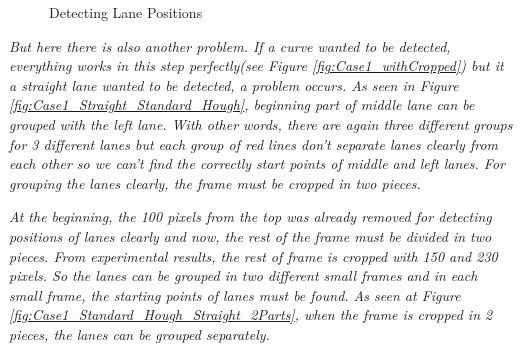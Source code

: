 \begin{figure}[H]
  \centering
  \hfill
  \caption{Detecting Lane Positions}
\end{figure}


\emph{\color{blue} But here there is also another problem. If a curve wanted to be detected, everything works in this step perfectly(see Figure \ref{fig:Case1_withCropped}) but it a straight lane wanted to be detected, a problem occurs. As seen in Figure \ref{fig:Case1_Straight_Standard_Hough}, beginning part of middle lane can be grouped with the left lane. With other words, there are again three different groups for 3 different lanes but each group of red lines don't separate lanes clearly from each other so we can't find the correctly start points of middle and left lanes. For grouping the lanes clearly, the frame must be cropped in two pieces.}

\emph{\color{blue} At the beginning, the 100 pixels from the top was already removed for detecting positions of lanes clearly and now, the rest of the frame must be divided in two pieces. From experimental results, the rest of frame is cropped with 150 and 230 pixels. So the lanes can be grouped in two different small frames and in each small frame, the starting points of lanes must be found. As seen at Figure \ref{fig:Case1_Standard_Hough_Straight_2Parts}, when the frame is cropped in 2 pieces, the lanes can be grouped separately.}

